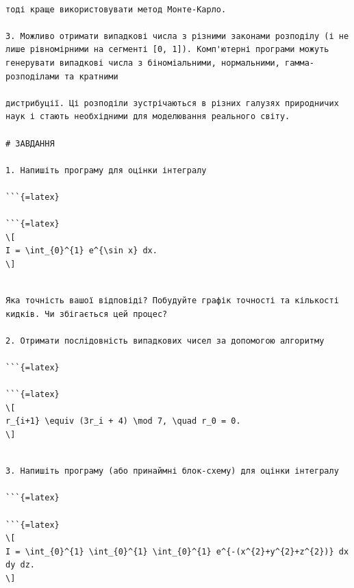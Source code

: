 \documentclass[
]{article}
\begin{document}
\begin{verbatim}

тоді краще використовувати метод Монте-Карло.

3. Можливо отримати випадкові числа з різними законами розподілу (і не лише рівномірними на сегменті [0, 1]). Комп'ютерні програми можуть генерувати випадкові числа з біноміальними, нормальними, гамма-розподілами та кратними

дистрибуції. Ці розподіли зустрічаються в різних галузях природничих наук і стають необхідними для моделювання реального світу.

# ЗАВДАННЯ

1. Напишіть програму для оцінки інтегралу

```{=latex}

```{=latex}
\[
I = \int_{0}^{1} e^{\sin x} dx.
\]
\end{verbatim}

\begin{verbatim}

Яка точність вашої відповіді? Побудуйте графік точності та кількості кидків. Чи збігається цей процес?

2. Отримати послідовність випадкових чисел за допомогою алгоритму

```{=latex}

```{=latex}
\[
r_{i+1} \equiv (3r_i + 4) \mod 7, \quad r_0 = 0.
\]
\end{verbatim}

\begin{verbatim}

3. Напишіть програму (або принаймні блок-схему) для оцінки інтегралу

```{=latex}

```{=latex}
\[
I = \int_{0}^{1} \int_{0}^{1} \int_{0}^{1} e^{-(x^{2}+y^{2}+z^{2})} dx dy dz.
\]
\end{verbatim}
\end{document}
